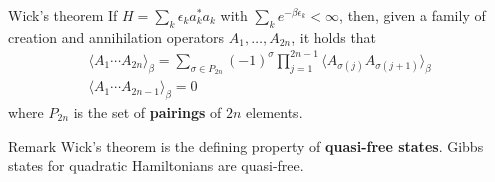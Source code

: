 \documentclass{beamer}
\begin{document}
\begin{frame}
	\begin{block}{Wick's theorem}
		If $H = \sum_{k}\epsilon_k a^*_ka_k$ with $\sum_ke^{-\beta\epsilon_k}<\infty$, then,
		given a family of creation and annihilation operators $A_1,\ldots,A_{2n}$, it holds
		that
		\begin{gather*}
			\langle A_1\cdots A_{2n}\rangle_\beta =
			\sum_{\sigma\in P_{2n}}(-1)^\sigma\prod_{j=1}^{2n-1}
			\langle A_{\sigma(j)}A_{\sigma(j+1)}\rangle_\beta\\
			\langle A_1\cdots A_{2n-1}\rangle_\beta = 0
		\end{gather*}
		where $P_{2n}$ is the set of \textbf{pairings} of $2n$ elements.
	\end{block}
	\begin{block}{Remark}
		Wick's theorem is the defining property of \textbf{quasi-free states}. Gibbs states
		for quadratic Hamiltonians are quasi-free.
	\end{block}
\end{frame}
\end{document}
